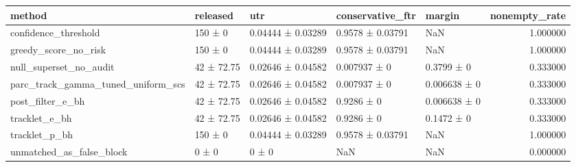 \begin{tabular}{lllllr}
\toprule
method & released & utr & conservative_ftr & margin & nonempty_rate \\
\midrule
confidence_threshold & 150 ± 0 & 0.04444 ± 0.03289 & 0.9578 ± 0.03791 & NaN & 1.000000 \\
greedy_score_no_risk & 150 ± 0 & 0.04444 ± 0.03289 & 0.9578 ± 0.03791 & NaN & 1.000000 \\
null_superset_no_audit & 42 ± 72.75 & 0.02646 ± 0.04582 & 0.007937 ± 0 & 0.3799 ± 0 & 0.333000 \\
parc_track_gamma_tuned_uniform_scs & 42 ± 72.75 & 0.02646 ± 0.04582 & 0.007937 ± 0 & 0.006638 ± 0 & 0.333000 \\
post_filter_e_bh & 42 ± 72.75 & 0.02646 ± 0.04582 & 0.9286 ± 0 & 0.006638 ± 0 & 0.333000 \\
tracklet_e_bh & 42 ± 72.75 & 0.02646 ± 0.04582 & 0.9286 ± 0 & 0.1472 ± 0 & 0.333000 \\
tracklet_p_bh & 150 ± 0 & 0.04444 ± 0.03289 & 0.9578 ± 0.03791 & NaN & 1.000000 \\
unmatched_as_false_block & 0 ± 0 & 0 ± 0 & NaN & NaN & 0.000000 \\
\bottomrule
\end{tabular}
